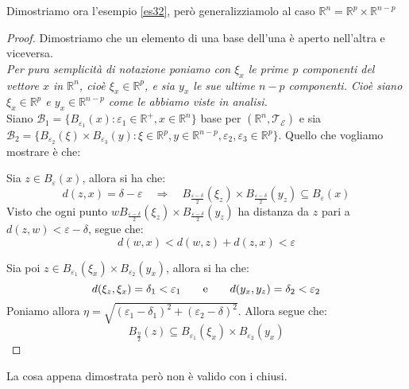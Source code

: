 \documentclass[11pt,a4paper,twoside]{article}
\theoremstyle{definition}
\begin{document}
Dimostriamo ora l'esempio \ref{es32}, però generalizziamolo al caso $\mathbb R^n = \mathbb R^p \times \mathbb R^{n-p}$
\begin{proof}
	Dimostriamo che un elemento di una base dell'una è aperto nell'altra e viceversa.\\
	\textit{Per pura semplicità di notazione poniamo con $\xi_x$ le prime p componenti del vettore $x$ in $\mathbb R^n$, cioè $\xi_x \in \mathbb R^p$, e sia $y_x$ le sue ultime $n-p$ componenti. Cioè siano $\xi_x \in \mathbb R^p$ e $y_x \in \mathbb R^{n-p}$ come le abbiamo viste in analisi.}\\
	Siano $\mathcal B_1 = \{B_{\varepsilon_1}(x) : \varepsilon_1 \in \mathbb R^+, x \in \mathbb R^n\}$ base per $(\mathbb R^n , \mathcal T_\mathcal E)$ e sia $\mathcal B_2 = \{B_{\varepsilon_2}(\xi) \times B_{\varepsilon_3}(y) : \xi \in \mathbb R^p, y \in \mathbb R^{n-p}, \varepsilon_2, \varepsilon_3 \in \mathbb R^p\}$.
	Quello che vogliamo mostrare è che:

	\begin{center}
	\end{center}

	Sia $z \in B_\varepsilon(x)$, allora si ha che:
	\[d(z, x) = \delta - \varepsilon \quad \Rightarrow \quad B_{\frac{\varepsilon - \delta}{2}}(\xi_z) \times B_{\frac{\varepsilon - \delta}2}(y_z) \subseteq B_\varepsilon(x)\]
	Visto che ogni punto $w  B_{\frac{\varepsilon - \delta}{2}}(\xi_z) \times B_{\frac{\varepsilon - \delta}2}(y_z)$ ha distanza da $z$ pari a $d(z, w)<\varepsilon-\delta$, segue che:
	\[ d(w, x) < d(w, z) + d(z, x) < \varepsilon \]

	Sia poi $z \in B_{\varepsilon_1}(\xi_x) \times B_{\varepsilon_2}(y_x)$, allora si ha che:
	\[d(\xi_z, \xi_x)=\delta_1 < \varepsilon_1 \qquad \text e \qquad d(y_x, y_z)= \delta_2 < \varepsilon_2\]
	Poniamo allora $\eta = \sqrt{(\varepsilon_1-\delta_1)^2 + (\varepsilon_2 - \delta)^2}$.
	Allora segue che:
	\[B_{\frac \eta 2}(z) \subseteq B_{\varepsilon_1}(\xi_x) \times B_{\varepsilon_2}(y_x)\]
\end{proof}

La cosa appena dimostrata però non è valido con i chiusi.
\end{document}
